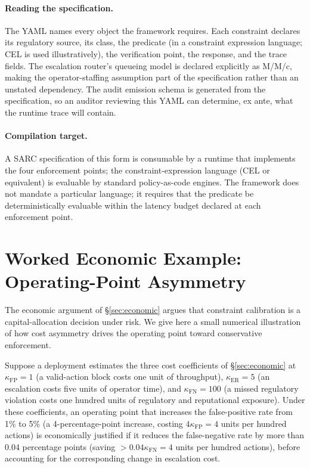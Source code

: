 \documentclass[11pt,a4paper]{article}
\theoremstyle{remark}
\begin{document}
\paragraph{Reading the specification.} The YAML names every object the framework requires. Each constraint declares its regulatory source, its class, the predicate (in a constraint expression language; CEL is used illustratively), the verification point, the response, and the trace fields. The escalation router's queueing model is declared explicitly as M/M/c, making the operator-staffing assumption part of the specification rather than an unstated dependency. The audit emission schema is generated from the specification, so an auditor reviewing this YAML can determine, ex ante, what the runtime trace will contain.

\paragraph{Compilation target.} A SARC specification of this form is consumable by a runtime that implements the four enforcement points; the constraint-expression language (CEL or equivalent) is evaluable by standard policy-as-code engines. The framework does not mandate a particular language; it requires that the predicate be deterministically evaluable within the latency budget declared at each enforcement point.

\section{Worked Economic Example: Operating-Point Asymmetry}\label{app:economic}

The economic argument of \S\ref{sec:economic} argues that constraint calibration is a capital-allocation decision under risk. We give here a small numerical illustration of how cost asymmetry drives the operating point toward conservative enforcement.

Suppose a deployment estimates the three cost coefficients of \S\ref{sec:economic} at $\kappa_{\text{FP}} = 1$ (a valid-action block costs one unit of throughput), $\kappa_{\text{ER}} = 5$ (an escalation costs five units of operator time), and $\kappa_{\text{FN}} = 100$ (a missed regulatory violation costs one hundred units of regulatory and reputational exposure). Under these coefficients, an operating point that increases the false-positive rate from 1\% to 5\% (a 4-percentage-point increase, costing $4 \kappa_{\text{FP}} = 4$ units per hundred actions) is economically justified if it reduces the false-negative rate by more than 0.04 percentage points (saving $> 0.04 \kappa_{\text{FN}} = 4$ units per hundred actions), before accounting for the corresponding change in escalation cost.
\end{document}
